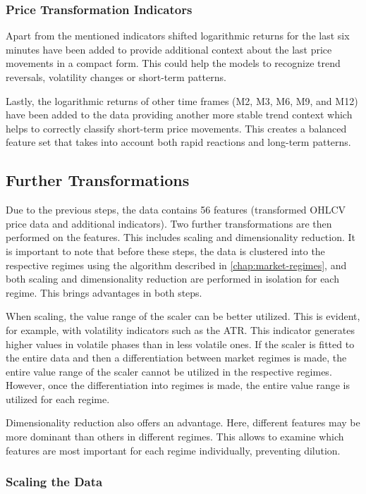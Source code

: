 \subsubsection{Price Transformation Indicators}

Apart from the mentioned indicators shifted logarithmic returns for the last six minutes have been added to provide additional context about the last price movements in a compact form.
This could help the models to recognize trend reversals, volatility changes or short-term patterns.

Lastly, the logarithmic returns of other time frames (M2, M3, M6, M9, and M12) have been added to the data providing another more stable trend context which helps to correctly classify short-term price movements.
This creates a balanced feature set that takes into account both rapid reactions and long-term patterns.

\subsection{Further Transformations}

Due to the previous steps, the data contains 56 features (transformed OHLCV price data and additional indicators).
Two further transformations are then performed on the features.
This includes scaling and dimensionality reduction.
It is important to note that before these steps, the data is clustered into the respective regimes using the algorithm described in \autoref{chap:market-regimes}, and both scaling and dimensionality reduction are performed in isolation for each regime.
This brings advantages in both steps.

When scaling, the value range of the scaler can be better utilized.
This is evident, for example, with volatility indicators such as the ATR.
This indicator generates higher values in volatile phases than in less volatile ones.
If the scaler is fitted to the entire data and then a differentiation between market regimes is made, the entire value range of the scaler cannot be utilized in the respective regimes.
However, once the differentiation into regimes is made, the entire value range is utilized for each regime.

Dimensionality reduction also offers an advantage.
Here, different features may be more dominant than others in different regimes.
This allows to examine which features are most important for each regime individually, preventing dilution.

\subsubsection{Scaling the Data}

